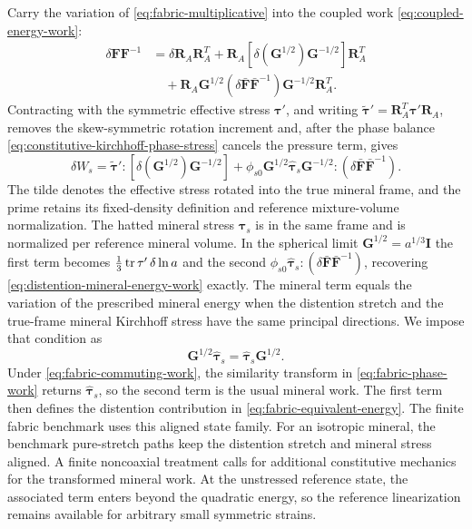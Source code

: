 Carry the variation of
\eqref{eq:fabric-multiplicative} into the coupled work
\eqref{eq:coupled-energy-work}:
\begin{align}
 \delta\mathbf F\mathbf F^{-1}
 &=\delta\mathbf R_A\mathbf R_A^T
   +\mathbf R_A\left[\delta(\mathbf G^{1/2})\mathbf G^{-1/2}\right]
        \mathbf R_A^T
 \nonumber\\
 &\quad+\mathbf R_A\mathbf G^{1/2}
        (\delta\bar{\mathbf F}\bar{\mathbf F}^{-1})
        \mathbf G^{-1/2}\mathbf R_A^T.
 \label{eq:fabric-virtual-deformation}
\end{align}
Contracting with the symmetric effective stress
\(\mathbf\tau'\), and writing
\(\widetilde{\mathbf\tau}'=\mathbf R_A^T\mathbf\tau'\mathbf R_A\), removes
the skew-symmetric rotation increment and, after the phase balance
\eqref{eq:constitutive-kirchhoff-phase-stress} cancels the pressure term,
gives
\begin{equation}
 \delta W_s=\widetilde{\mathbf\tau}':
   \left[\delta(\mathbf G^{1/2})\mathbf G^{-1/2}\right]
   +\phi_{s0}\mathbf G^{1/2}\widehat{\mathbf\tau}_s\mathbf G^{-1/2}:
   (\delta\bar{\mathbf F}\bar{\mathbf F}^{-1}).
 \label{eq:fabric-phase-work}
\end{equation}
The tilde denotes the effective stress rotated into the true mineral
frame, and the prime retains its fixed-density definition and reference
mixture-volume normalization.
The hatted mineral stress \(\widehat{\mathbf\tau}_s\) is in the same frame
and is normalized per reference mineral volume.
In the spherical limit \(\mathbf G^{1/2}=a^{1/3}\mathbf I\) the first term
becomes \(\tfrac13\operatorname{tr}\mathbf\tau'\,\delta\ln a\) and the second
\(\phi_{s0}\widehat{\mathbf\tau}_s:(\delta\bar{\mathbf F}\bar{\mathbf F}^{-1})\),
recovering \eqref{eq:distention-mineral-energy-work} exactly. The mineral term equals the variation of the prescribed mineral energy
when the distention stretch and the true-frame mineral Kirchhoff stress
have the same principal directions. We impose that condition as
\begin{equation}
 \mathbf G^{1/2}\widehat{\mathbf\tau}_s
 =\widehat{\mathbf\tau}_s\mathbf G^{1/2}.
 \label{eq:fabric-commuting-work}
\end{equation}
Under \eqref{eq:fabric-commuting-work}, the similarity transform in
\eqref{eq:fabric-phase-work} returns \(\widehat{\mathbf\tau}_s\), so the
second term is the usual mineral work. The first term then defines the
distention contribution in \eqref{eq:fabric-equivalent-energy}. The finite
fabric benchmark uses this aligned state family. For an isotropic mineral,
the benchmark pure-stretch paths keep the distention stretch and mineral
stress aligned. A finite noncoaxial treatment calls for additional
constitutive mechanics for the transformed mineral work. At the unstressed
reference state, the associated term enters beyond the quadratic energy, so
the reference linearization remains available for arbitrary small
symmetric strains.

